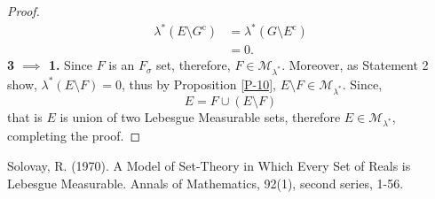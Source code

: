 \documentclass{article}
\theoremstyle{definition}
\theoremstyle{remark}
\theoremstyle{definition}
\theoremstyle{definition}
\theoremstyle{definition}
\newcommand{\union}{\cup}
\newcommand{\comp}[1]{#1^{\text{c}}}
\newcommand{\lom}[1]{\lambda^*\left (#1\right )}
\newcommand{\set}[1]{\mathscr{#1}}
\newcommand{\msigm}[1]{\set{M}_{#1}}
\begin{document}
\begin{proof}
\begin{equation*}
	\begin{split}
		\lom{E\setminus\comp{G}} &= \lom{G\setminus\comp{E}}\\
		&= 0.
	\end{split}
\end{equation*}
\textbf{3 $ \implies $ 1.} Since $ F $ is an $ F_\sigma $ set, therefore, $ F \in \msigm{\lambda^*}$. Moreover, as Statement 2 show, $ \lom{E\setminus F} = 0 $, thus by Proposition \ref{P-10}, $ E\setminus F \in \msigm{\lambda^*}$. Since,
\[E = F \union (E\setminus F)\]
that is $ E $ is union of two Lebesgue Measurable sets, therefore $ E \in \msigm{\lambda^*} $, completing the proof.
\end{proof}
\hrulefill










\newpage
\begin{thebibliography}{9}
	Solovay, R. (1970). A Model of Set-Theory in Which Every Set of Reals is Lebesgue Measurable. Annals of Mathematics, 92(1), second series, 1-56.
\end{thebibliography}
\end{document}
